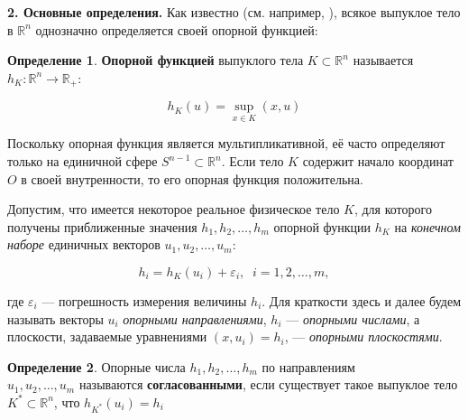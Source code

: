 \documentclass[a4paper, 10pt]{article}
\theoremstyle{definition}
\newtheorem{SmartDefinition}{Определение}
\theoremstyle{plain}
\theoremstyle{plain}
\begin{document}
\textbf{2. Основные определения.} Как известно (см. например,
\cite{GhoshKumar}), всякое выпуклое тело в $\mathbb{R}^{n}$
однозначно определяется своей опорной функцией:

\begin{SmartDefinition}
 \label{def:support-function}
 \textbf{Опорной функцией} выпуклого тела $K \subset \mathbb{R}^{n}$
 называется
 $h_{K}: \mathbb{R}^{n} \to \mathbb{R}_{+}$:

 \begin{equation*}h_{K}(u) = \sup \limits_{x \in K}(x, u)\end{equation*}
\end{SmartDefinition}

Поскольку опорная функция является мультипликативной, её часто определяют только
на единичной сфере $S^{n - 1} \subset \mathbb{R}^{n}$. Если тело $K$ содержит
начало координат $O$ в своей внутренности, то его опорная функция положительна.

Допустим, что имеется некоторое реальное физическое тело $K$, для которого
получены приближенные значения $h_{1}, h_{2}, \ldots, h_{m}$ опорной функции
$h_{K}$ на \textit{конечном наборе} единичных векторов
$u_{1}, u_{2}, \ldots, u_{m}$:

\begin{equation*}
 h_{i} = h_{K}(u_{i}) + \varepsilon_{i}, \;\; i = 1, 2, \ldots, m,
\end{equation*}

где $\varepsilon_{i}$ --- погрешность измерения величины $h_{i}$. Для краткости
здесь и далее будем называть векторы $u_{i}$ \textit{опорными направлениями},
$h_{i}$ --- \textit{опорными числами}, а плоскости, задаваемые уравнениями
$(x, u_{i}) = h_{i}$, --- \textit{опорными плоскостями}.

\begin{SmartDefinition}
 \label{def:consistency}
 Опорные числа $h_{1}, h_{2}, \ldots, h_{m}$ по направлениям \\
 $u_{1}, u_{2}, \ldots, u_{m}$ называются \textbf{согласованными}, если
 существует такое выпуклое тело  $K^{*} \subset \mathbb{R}^{n}$, что
 $h_{K^{*}}(u_{i}) = h_{i}$
\end{SmartDefinition}
\end{document}
